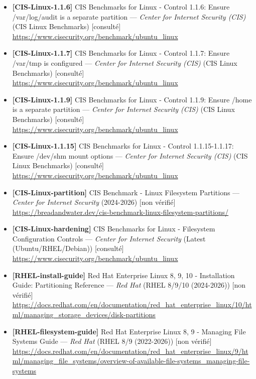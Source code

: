 \documentclass[10pt,a4paper]{article}
\begin{document}
\begin{itemize}[leftmargin=1.6em]
\item \textbf{[CIS-Linux-1.1.6]} CIS Benchmarks for Linux - Control 1.1.6: Ensure /var/log/audit is a separate partition --- \textit{Center for Internet Security (CIS)} (CIS Linux Benchmarks) \textcolor{cOk}{[consult\'e]}\\ \url{https://www.cisecurity.org/benchmark/ubuntu_linux}
\item \textbf{[CIS-Linux-1.1.7]} CIS Benchmarks for Linux - Control 1.1.7: Ensure /var/tmp is configured --- \textit{Center for Internet Security (CIS)} (CIS Linux Benchmarks) \textcolor{cOk}{[consult\'e]}\\ \url{https://www.cisecurity.org/benchmark/ubuntu_linux}
\item \textbf{[CIS-Linux-1.1.9]} CIS Benchmarks for Linux - Control 1.1.9: Ensure /home is a separate partition --- \textit{Center for Internet Security (CIS)} (CIS Linux Benchmarks) \textcolor{cOk}{[consult\'e]}\\ \url{https://www.cisecurity.org/benchmark/ubuntu_linux}
\item \textbf{[CIS-Linux-1.1.15]} CIS Benchmarks for Linux - Control 1.1.15-1.1.17: Ensure /dev/shm mount options --- \textit{Center for Internet Security (CIS)} (CIS Linux Benchmarks) \textcolor{cOk}{[consult\'e]}\\ \url{https://www.cisecurity.org/benchmark/ubuntu_linux}
\item \textbf{[CIS-Linux-partition]} CIS Benchmark - Linux Filesystem Partitions --- \textit{Center for Internet Security} (2024-2026) \textcolor{cMed}{[non v\'erifi\'e]}\\ \url{https://breadandwater.dev/cis-benchmark-linux-filesystem-partitions/}
\item \textbf{[CIS-Linux-hardening]} CIS Benchmarks for Linux - Filesystem Configuration Controls --- \textit{Center for Internet Security} (Latest (Ubuntu/RHEL/Debian)) \textcolor{cOk}{[consult\'e]}\\ \url{https://www.cisecurity.org/benchmark/ubuntu_linux}
\item \textbf{[RHEL-install-guide]} Red Hat Enterprise Linux 8, 9, 10 - Installation Guide: Partitioning Reference --- \textit{Red Hat} (RHEL 8/9/10 (2024-2026)) \textcolor{cMed}{[non v\'erifi\'e]}\\ \url{https://docs.redhat.com/en/documentation/red_hat_enterprise_linux/10/html/managing_storage_devices/disk-partitions}
\item \textbf{[RHEL-filesystem-guide]} Red Hat Enterprise Linux 8, 9 - Managing File Systems Guide --- \textit{Red Hat} (RHEL 8/9 (2022-2026)) \textcolor{cMed}{[non v\'erifi\'e]}\\ \url{https://docs.redhat.com/en/documentation/red_hat_enterprise_linux/9/html/managing_file_systems/overview-of-available-file-systems_managing-file-systems}

\end{itemize}
\end{document}
